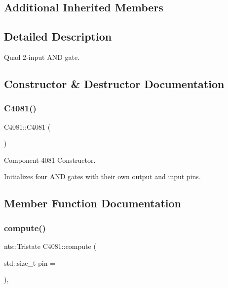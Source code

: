 \subsection*{Additional Inherited Members}


\subsection{Detailed Description}
Quad 2-\/input A\+ND gate. 

\subsection{Constructor \& Destructor Documentation}
\mbox{\label{classC4081_afa84f979826cb257f236fee5a92b4af6}} 
\subsubsection{\texorpdfstring{C4081()}{C4081()}}
{\footnotesize\ttfamily C4081\+::\+C4081 (\begin{DoxyParamCaption}{ }\end{DoxyParamCaption})}



Component 4081 Constructor. 

Initializes four A\+ND gates with their own output and input pins. 

\subsection{Member Function Documentation}
\mbox{\label{classC4081_a1c32e380468dd0ccfe9da7fa6432d31a}} 
\subsubsection{\texorpdfstring{compute()}{compute()}}
{\footnotesize\ttfamily nts\+::\+Tristate C4081\+::compute (\begin{DoxyParamCaption}\item[{std\+::size\+\_\+t}]{pin = {} }\end{DoxyParamCaption})\hspace{0.3cm}{\ttfamily [override]}, {\ttfamily [virtual]}}



